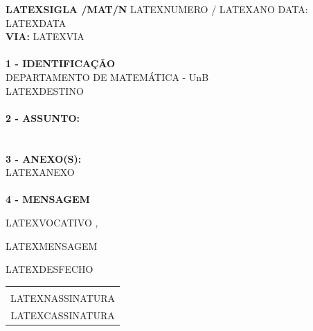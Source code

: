 \documentclass[12pt]{artigo}
\begin{document}
\vspace*{.8cm}
\timbrado
\parindent=2cm 
\setlength{\baselineskip}{5mm}
\noindent 
\begin{minipage}{16cm}
\vspace*{-12mm}
\parindent=2cm
\setlength{\baselineskip}{5mm}
\vspace*{.2cm}
\noindent
\small
{\bf  LATEXSIGLA /MAT/N\primo} LATEXNUMERO / LATEXANO \hfill {DATA:} {LATEXDATA}
\vum \\
{\bf VIA:} {LATEXVIA}  
\\
\mbox{} \hrulefill
\\
{\bf 1 - IDENTIFICA\c{C}\~AO} 
\\
\phantom{xxx}{\bf Proced\^encia:} {DEPARTAMENTO DE MATEM\'ATICA - UnB}
\\
 {LATEXDESTINO }
\\
\mbox{} \hrulefill
\\
{\bf 2 - ASSUNTO:} 
\\
\phantom{xxx}{LATEXASSUNTO }
\\
\mbox{} \hrulefill
\\
{\bf 3 - ANEXO(S):} 
\\
\phantom{xxx} {LATEXANEXO }
\\
\mbox{} \hrulefill
\\
{ \bf 4 - MENSAGEM} 
\end{minipage}
\setlength{\baselineskip}{9mm}

\vspace*{1.5cm} 
LATEXVOCATIVO ,
\vspace*{10mm} 

LATEXMENSAGEM
\vspace*{1.0cm} 

LATEXDESFECHO 
\vspace*{1.0cm} 
\hspace*{5.5cm}
\setlength{\baselineskip}{4mm}
\begin{center}
\begin{tabular}{c}
\hline \vspace*{-3mm}\\
LATEXNASSINATURA \\
{\small LATEXCASSINATURA}
\end{tabular}
\end{center}
\end{document}
